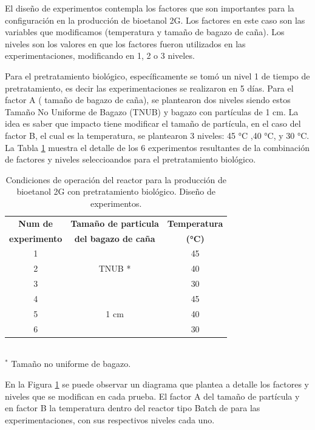 \documentclass[12pt]{article}
\begin{document}
			
	El diseño de experimentos contempla los factores que son importantes para la configuración en la producción de bioetanol 2G. Los factores en este caso son las variables que modificamos (temperatura y tamaño de bagazo de caña).	Los niveles son los valores en que los factores fueron utilizados en las experimentaciones, modificando en 1, 2 o 3 niveles.
	
	Para el pretratamiento biológico, específicamente se tomó un nivel 1 de tiempo de pretratamiento, es decir las experimentaciones se realizaron en 5 días. Para el factor A ( tamaño de bagazo de caña), se plantearon dos niveles siendo estos Tamaño No Uniforme de Bagazo (TNUB) y bagazo con partículas de 1 cm. La idea es saber que impacto tiene modificar el tamaño de partícula, en el caso del factor B, el cual es la temperatura, se plantearon 3 niveles: 45 °C ,40 °C, y 30 °C. La Tabla \ref{biologico2} muestra el detalle de los 6 experimentos resultantes de la combinación de factores y niveles seleccioandos para el pretratamiento biológico.
	

		
	
\begin{table}[H]
	\centering
	\caption{Condiciones de operación del reactor para la producción de bioetanol 2G con pretratamiento biológico. Diseño de experimentos.}
	\label{biologico2}
		\begin{tabular}{|c|c|c|  }
			\hline
			\textbf{Num de} & \textbf{Tamaño de particula } & \textbf{Temperatura} \\
		\textbf{experimento} 	& \textbf{ del bagazo de caña} &  \textbf{(°C)}   \\		
			\hline
			1   & \multirow{3}{*}{TNUB *} & 45  \\	\cline{1-1}	
			2 &  & 40 \\ \cline{1-1} 						
			3 &  & 30 \\ \cline{1-3}			
			4 &\multirow{3}{*}{1 cm} & 45    \\\cline{1-1}			
			5 &  & 40   \\  \cline{1-1}				
			6 &  & 30     \\  \cline{1-1}		
			\hline
		\end{tabular}
	\\[3pt] %
	\footnotesize{$^{*}$  Tamaño no uniforme de bagazo.}
	
\end{table}


En la Figura \ref{biologico2} se puede observar un diagrama que plantea a detalle los factores y niveles que se modifican en cada prueba. El factor A del tamaño de partícula y en factor B la temperatura dentro del reactor tipo Batch de para las experimentaciones, con sus respectivos niveles cada uno.
\end{document}
